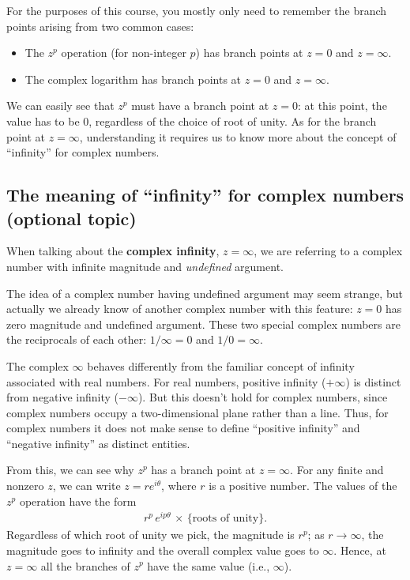 \documentclass[10pt,a4paper]{article}
\begin{document}
For the purposes of this course, you mostly only need to remember the
branch points arising from two common cases:

\begin{itemize}
\item The $z^p$ operation (for non-integer $p$) has branch points at
  $z = 0$ and $z = \infty$.

\item The complex logarithm has branch points at $z = 0$ and $z = \infty$.
\end{itemize}

\noindent
We can easily see that $z^p$ must have a branch point at $z = 0$: at
this point, the value has to be $0$, regardless of the choice of root
of unity. As for the branch point at $z = \infty$, understanding it
requires us to know more about the concept of ``infinity'' for complex
numbers.

\subsection{The meaning of ``infinity'' for complex numbers (optional topic)}
\label{aside-the-meaning-of-infinity-for-complex-numbers}

When talking about the \textbf{complex infinity}, $z = \infty$, we are
referring to a complex number with infinite magnitude and
\textit{undefined} argument.

The idea of a complex number having undefined argument may seem
strange, but actually we already know of another complex number with
this feature: $z = 0$ has zero magnitude and undefined argument.
These two special complex numbers are the reciprocals of each other:
$1/\infty = 0$ and $1/0 = \infty$.

The complex $\infty$ behaves differently from the familiar concept of
infinity associated with real numbers. For real numbers, positive
infinity ($+\infty$) is distinct from negative infinity
($-\infty$). But this doesn't hold for complex numbers, since complex
numbers occupy a two-dimensional plane rather than a line. Thus, for
complex numbers it does not make sense to define ``positive infinity''
and ``negative infinity'' as distinct entities.

From this, we can see why $z^p$ has a branch point at $z =
\infty$. For any finite and nonzero $z$, we can write $z =
re^{i\theta}$, where $r$ is a positive number. The values of the $z^p$
operation have the form
\begin{align}
  r^p \, e^{ip\theta}\,\times\, \{\text{roots of unity}\}.
\end{align}
Regardless of which root of unity we pick, the magnitude is $r^p$; as
$r \rightarrow \infty$, the magnitude goes to infinity and the overall
complex value goes to $\infty$. Hence, at $z = \infty$ all the
branches of $z^p$ have the same value (i.e., $\infty$).
\end{document}
